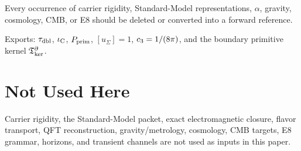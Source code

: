 \documentclass[11pt,a4paper]{article}
\begin{document}
\begin{tfptwarningbox}
Every occurrence of carrier rigidity, Standard-Model representations, $\alpha$, gravity,
cosmology, CMB, or E8 should be deleted or converted into a forward reference.
\end{tfptwarningbox}


\begin{tfptexports}
Exports: $\tau_{\mathrm{dbl}}$, $\iota_{\mathrm C}$, $P_{\mathrm{prim}}$, $[u_\Sigma]=1$, $c_3=1/(8\pi)$, and the boundary primitive kernel $\mathfrak T_{\mathrm{ker}}^\partial$.
\end{tfptexports}

\section{Not Used Here}

Carrier rigidity, the Standard-Model packet, exact electromagnetic closure, flavor transport,
QFT reconstruction, gravity/metrology, cosmology, CMB targets, E8 grammar, horizons, and transient
channels are not used as inputs in this paper.

\clearpage

\end{document}
